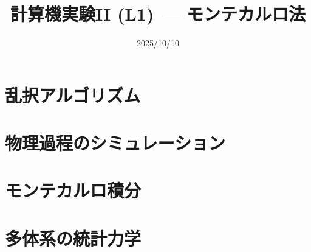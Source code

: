 \documentclass[10pt,dvipdfmx]{beamer}
\title{計算機実験II (L1) --- モンテカルロ法}
\date{2025/10/10}
\begin{document}
\begin{frame}
  \titlepage
  \tableofcontents
\end{frame}



% 

\section{乱択アルゴリズム}






\section{物理過程のシミュレーション}






\section{モンテカルロ積分}












\section{多体系の統計力学}
\end{document}
